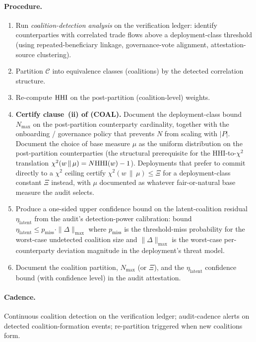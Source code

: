 \paragraph{Procedure.}
\begin{enumerate}
\item Run \emph{coalition-detection analysis} on the verification
  ledger: identify counterparties with correlated trade flows
  above a deployment-class threshold (using
  repeated-beneficiary linkage, governance-vote alignment,
  attestation-source clustering).
\item Partition $\mathcal{C}$ into equivalence classes
  (coalitions) by the detected correlation structure.
\item Re-compute $\mathrm{HHI}$ on the post-partition (coalition-level)
  weights.
\item \textbf{Certify clause~(ii) of (COAL).} Document the
  deployment-class bound $N_{\max}$ on the post-partition
  counterparty cardinality, together with the onboarding /
  governance policy that prevents $N$ from scaling with $|P|$.
  Document the choice of base measure $\mu$ as the uniform
  distribution on the post-partition counterparties (the
  structural prerequisite for the HHI-to-$\chi^2$ translation
  $\chi^2(w \,\|\, \mu) = N \mathrm{HHI}(w) - 1$). Deployments that
  prefer to commit directly to a $\chi^2$ ceiling certify
  $\chi^2(w \,\|\, \mu) \leq \Xi$ for a deployment-class constant
  $\Xi$ instead, with $\mu$ documented as whatever fair-or-natural
  base measure the audit selects.
\item Produce a one-sided upper confidence bound on the
  latent-coalition residual $\eta_\mathrm{latent}$ from the
  audit's detection-power calibration: bound $\eta_\mathrm{latent}
  \leq p_\mathrm{miss} \cdot \|\Delta\|_{\max}$ where
  $p_\mathrm{miss}$ is the threshold-miss probability for the
  worst-case undetected coalition size and $\|\Delta\|_{\max}$ is
  the worst-case per-counterparty deviation magnitude in the
  deployment's threat model.
\item Document the coalition partition, $N_{\max}$ (or $\Xi$),
  and the $\eta_\mathrm{latent}$ confidence bound (with confidence
  level) in the audit attestation.
\end{enumerate}

\paragraph{Cadence.} Continuous coalition detection on the
verification ledger; audit-cadence alerts on detected
coalition-formation events; re-partition triggered when new
coalitions form.

